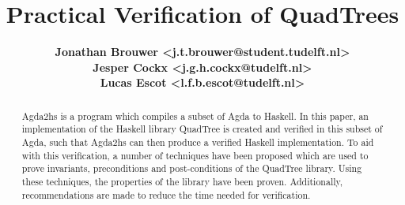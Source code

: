 \documentclass[english]{article}
\begin{document}
\title{\textbf{Practical Verification of QuadTrees}}
\author{
	\textbf{Jonathan Brouwer <j.t.brouwer@student.tudelft.nl>} \\ 
	\textbf{Jesper Cockx <j.g.h.cockx@tudelft.nl>} \\ 
	\textbf{Lucas Escot <l.f.b.escot@tudelft.nl>} \\ 
}
\maketitle

\vspace{-2em}
\begin{abstract}
Agda2hs is a program which compiles a subset of Agda to Haskell. In this paper, an implementation of the Haskell library QuadTree is created and verified in this subset of Agda, such that Agda2hs can then produce a verified Haskell implementation. To aid with this verification, a number of techniques have been proposed which are used to prove invariants, preconditions and post-conditions of the QuadTree library. Using these techniques, the properties of the library have been proven. Additionally, recommendations are made to reduce the time needed for verification.
\end{abstract}









\end{document}
